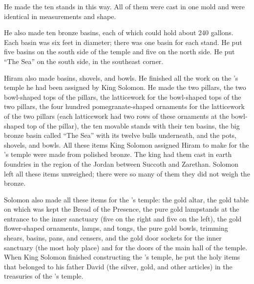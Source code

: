 {He made
the ten
stands
in this
way. All
of them were cast
in one
mold and were identical
in measurements
and shape.
\par }{\PP {}He also made
ten
bronze
basins,
each of which could hold
about 240 gallons.
Each
basin
was six feet
in diameter; there was one
basin
for each
stand.
He put
five
basins
on
the south
side
of the temple
and five
on
the north
side.
He put
“The
Sea”
on the south
side,
in the southeast corner.
\par }{\PP {}Hiram
also made
basins,
shovels,
and bowls.
He
finished
all
the work
on the
{}’s
temple
he had
been assigned
by King
Solomon.
He made the two
pillars,
the two
bowl-shaped
tops
of the pillars,
the latticework
for the bowl-shaped
tops
of the two pillars,
the four
hundred
pomegranate-shaped
ornaments for the latticework of the two
pillars (each latticework
had two
rows
of these ornaments
at the bowl-shaped
top
of the pillar),
the ten
movable stands with their ten basins,
the big bronze basin
called “The Sea”
with its twelve
bulls
underneath,
and the pots,
shovels,
and bowls.
All
these
items
King
Solomon
assigned Hiram
to make
for the
{}’s
temple
were made from polished
bronze.
The king
had them cast
in earth
foundries
in the region
of the Jordan
between
Succoth
and Zarethan.
Solomon
left
all
these items
unweighed;
there were so
many of them they did not
weigh
the bronze.
\par }{\PP {}Solomon
also
made
all
these items
for the
{}’s
temple: the gold
altar,
the gold
table
on
which
was kept the Bread
of the Presence,
the pure
gold
lampstands
at the entrance
to the inner sanctuary
(five
on the right
and five
on the left), the gold
flower-shaped
ornaments, lamps,
and tongs,
the
pure gold bowls,
trimming
shears, basins,
pans,
and censers,
and the gold
door
sockets
for the inner
sanctuary
(the most
holy
place) and for the doors
of the main hall
of the temple.
When King
Solomon
finished
constructing
the
{}’s
temple,
he
put
the holy
items that belonged to his father
David
(the
silver,
gold,
and other articles) in the treasuries
of the
{}’s
temple.

}

